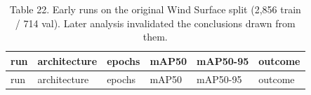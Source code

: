 \documentclass[
  10pt,
]{article}
\begin{document}
\begin{longtable}[]{@{}
  >{\raggedright\arraybackslash}p{}
  >{\raggedright\arraybackslash}p{}
  >{\raggedright\arraybackslash}p{}
  >{\raggedright\arraybackslash}p{}
  >{\raggedright\arraybackslash}p{}
  >{\raggedright\arraybackslash}p{}@{}}
\caption{Table 22. Early runs on the original Wind Surface split (2,856
train / 714 val). Later analysis invalidated the conclusions drawn from
them.}\tabularnewline
\toprule\noalign{}
\begin{minipage}[b]{\linewidth}\raggedright
run
\end{minipage} & \begin{minipage}[b]{\linewidth}\raggedright
architecture
\end{minipage} & \begin{minipage}[b]{\linewidth}\raggedright
epochs
\end{minipage} & \begin{minipage}[b]{\linewidth}\raggedright
mAP50
\end{minipage} & \begin{minipage}[b]{\linewidth}\raggedright
mAP50-95
\end{minipage} & \begin{minipage}[b]{\linewidth}\raggedright
outcome
\end{minipage} \\
\midrule\noalign{}
\endfirsthead
\toprule\noalign{}
\begin{minipage}[b]{\linewidth}\raggedright
run
\end{minipage} & \begin{minipage}[b]{\linewidth}\raggedright
architecture
\end{minipage} & \begin{minipage}[b]{\linewidth}\raggedright
epochs
\end{minipage} & \begin{minipage}[b]{\linewidth}\raggedright
mAP50
\end{minipage} & \begin{minipage}[b]{\linewidth}\raggedright
mAP50-95
\end{minipage} & \begin{minipage}[b]{\linewidth}\raggedright
outcome
\end{minipage} \\

\end{longtable}
\end{document}
